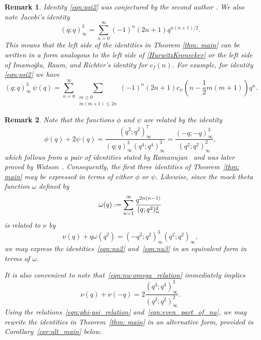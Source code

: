 \documentclass[11pt,reqno]{amsart}
\renewcommand{\=}{\;=\;}
\theoremstyle{myremark}
\newtheorem{remark}{Remark}
\begin{document}
\begin{remark}
Identity \eqref{eqn:psi2} was conjectured by the second author 
\cite{FG}. 
We also note Jacobi's identity
\begin{equation} \label{eqn:Jacobi_identity}
(q;q)_\infty^3 = \sum_{n=0}^\infty (-1)^n (2n +1) q^{n(n+1)/2}.
\end{equation}
This means that the left side of the identities in Theorem \ref{thm: main} 
can be written in a form analogous to the left side of 
\eqref{HurwitzKronecker} or the left side of Imamo\u{g}lu, Raum, and Richter's identity for $c_f(n)$. 
For example, for identity \eqref{eqn:psi2} we have
$$
(q;q)_\infty^3\,\psi(q)=
\sum_{n=0}^\infty 
\sum_{\substack{m\ge0\\ m(m+1)\leq2n}}
(-1)^n (2n+1) c_\psi\left(n - \frac{1}{2}m(m+1)\right) q^n.
$$
\end{remark}
\begin{remark}
Note that the functions $\phi$ and $\psi$ are related by the identity
\begin{equation} \label{eqn:phi-psi_relation}
\phi(q) + 2\psi(q) = \frac{(q^2;q^2)^7_\infty}{(q;q)^3_\infty (q^4;q^4)_\infty^3}
=\frac{(-q;-q)_\infty^3}{(q^2;q^2)^2_\infty},
\end{equation}
which follows from a pair of identities stated by Ramanujan~\cite[p.~354]{Ramanujan1927} and was later proved by Watson~\cite[p.~70]{Watson1936}. Consequently, the first three identities of Theorem~\ref{thm: main} may be expressed in terms of either $\phi$ or $\psi$. Likewise, since the mock theta function $\omega$ defined by
\begin{equation} \label{eqn:omega_def}
\omega(q) := \sum_{n=1}^\infty {q^{2n(n-1)} \over (q;q^2)_n^2}
\end{equation}
is related to $\nu$ \cite[p.~72]{Watson1936} by
\begin{equation} \label{eqn:nu-omega_relation}
\nu(q) + q\omega(q^2) = (-q^2;q^2)_\infty^3 (q^2;q^2)_\infty,
\end{equation}
we may express the identities~\eqref{eqn:nu2} and~\eqref{eqn:nu3} in an equivalent form in terms of $\omega$.

It is also convenient to note that~\eqref{eqn:nu-omega_relation} immediately implies
\begin{equation} \label{eqn:even_part_of_nu}
\nu(q) + \nu(-q) = 2\frac{(q^4;q^4)^3_\infty}{(q^2;q^2)^2_\infty}.
\end{equation}
Using the relations~\eqref{eqn:phi-psi_relation} and~\eqref{eqn:even_part_of_nu}, we may rewrite the identities in Theorem~\ref{thm: main} in an alternative form, provided in Corollary~\ref{cor:alt_main} below.
\end{remark}
\end{document}
